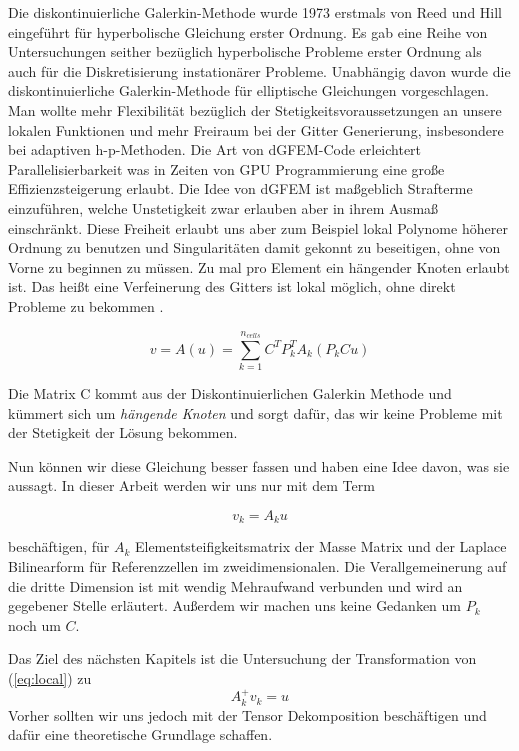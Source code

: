 Die diskontinuierliche Galerkin-Methode wurde 1973 erstmals von Reed und Hill eingeführt für hyperbolische Gleichung erster Ordnung. Es gab eine Reihe von Untersuchungen seither bezüglich hyperbolische Probleme erster Ordnung als auch für die Diskretisierung instationärer Probleme.
Unabhängig davon wurde die diskontinuierliche Galerkin-Methode für elliptische Gleichungen vorgeschlagen. Man wollte mehr Flexibilität bezüglich der Stetigkeitsvoraussetzungen an unsere lokalen Funktionen und mehr Freiraum bei der Gitter Generierung, insbesondere bei adaptiven h-p-Methoden. 
Die Art von dGFEM-Code erleichtert Parallelisierbarkeit was in Zeiten von GPU Programmierung eine große Effizienzsteigerung erlaubt. 
Die Idee von dGFEM ist maßgeblich Strafterme einzuführen, welche Unstetigkeit zwar erlauben aber in ihrem Ausmaß einschränkt. Diese Freiheit erlaubt uns aber zum Beispiel lokal Polynome höherer Ordnung zu benutzen und Singularitäten damit gekonnt zu beseitigen, ohne von Vorne zu beginnen zu müssen. Zu mal pro Element ein hängender Knoten erlaubt ist. Das heißt eine Verfeinerung des Gitters ist lokal möglich, ohne direkt Probleme zu bekommen \cite[292]{Numerik}.

\begin{equation} \label{eq:main3}
v=A(u)=\sum_{k=1}^{n_{cells}} C^T P_k^T A_k (P_k Cu)
\end{equation}

Die Matrix C kommt aus der Diskontinuierlichen Galerkin Methode und kümmert sich um \textit{hängende Knoten} und sorgt dafür, das wir keine Probleme mit der Stetigkeit der Lösung bekommen.

Nun können wir diese Gleichung besser fassen und haben eine Idee davon, was sie aussagt.
In dieser Arbeit werden wir uns nur mit dem Term 

\begin{equation} \label{eq:local}
v_k = A_k u
\end{equation}

beschäftigen, für $A_k$ Elementsteifigkeitsmatrix der Masse Matrix und der Laplace Bilinearform für Referenzzellen im zweidimensionalen. Die Verallgemeinerung auf die dritte Dimension ist mit wendig Mehraufwand verbunden und wird an gegebener Stelle erläutert. Außerdem wir machen uns keine Gedanken um $P_k$ noch um $C$. 

Das Ziel des nächsten Kapitels ist die Untersuchung der Transformation von (\ref{eq:local}) zu 
\begin{equation}
A_k^{+} v_k = u  
\end{equation}
Vorher sollten wir uns jedoch mit der Tensor Dekomposition beschäftigen und dafür eine theoretische Grundlage schaffen.
